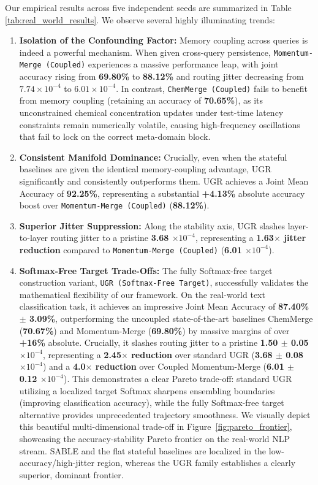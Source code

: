 Our empirical results across five independent seeds are summarized in Table \ref{tab:real_world_results}. We observe several highly illuminating trends:
\begin{enumerate}
    \item \textbf{Isolation of the Confounding Factor:} Memory coupling across queries is indeed a powerful mechanism. When given cross-query persistence, \texttt{Momentum-Merge (Coupled)} experiences a massive performance leap, with joint accuracy rising from \textbf{69.80\%} to \textbf{88.12\%} and routing jitter decreasing from $7.74 \times 10^{-4}$ to $6.01 \times 10^{-4}$. In contrast, \texttt{ChemMerge (Coupled)} fails to benefit from memory coupling (retaining an accuracy of \textbf{70.65\%}), as its unconstrained chemical concentration updates under test-time latency constraints remain numerically volatile, causing high-frequency oscillations that fail to lock on the correct meta-domain block.
    \item \textbf{Consistent Manifold Dominance:} Crucially, even when the stateful baselines are given the identical memory-coupling advantage, UGR significantly and consistently outperforms them. UGR achieves a Joint Mean Accuracy of \textbf{92.25\%}, representing a substantial \textbf{+4.13\%} absolute accuracy boost over \texttt{Momentum-Merge (Coupled)} (\textbf{88.12\%}).
    \item \textbf{Superior Jitter Suppression:} Along the stability axis, UGR slashes layer-to-layer routing jitter to a pristine \textbf{3.68 $\times 10^{-4}$}, representing a \textbf{1.63$\times$ jitter reduction} compared to \texttt{Momentum-Merge (Coupled)} (\textbf{6.01 $\times 10^{-4}$}).
    \item \textbf{Softmax-Free Target Trade-Offs:} The fully Softmax-free target construction variant, \texttt{UGR (Softmax-Free Target)}, successfully validates the mathematical flexibility of our framework. On the real-world text classification task, it achieves an impressive Joint Mean Accuracy of \textbf{87.40\% $\pm$ 3.09\%}, outperforming the uncoupled state-of-the-art baselines ChemMerge (\textbf{70.67\%}) and Momentum-Merge (\textbf{69.80\%}) by massive margins of over \textbf{+16\%} absolute. Crucially, it slashes routing jitter to a pristine \textbf{1.50 $\pm$ 0.05 $\times 10^{-4}$}, representing a \textbf{2.45$\times$ reduction} over standard UGR (\textbf{3.68 $\pm$ 0.08 $\times 10^{-4}$}) and a \textbf{4.0$\times$ reduction} over Coupled Momentum-Merge (\textbf{6.01 $\pm$ 0.12 $\times 10^{-4}$}). This demonstrates a clear Pareto trade-off: standard UGR utilizing a localized target Softmax sharpens ensembling boundaries (improving classification accuracy), while the fully Softmax-free target alternative provides unprecedented trajectory smoothness. We visually depict this beautiful multi-dimensional trade-off in Figure~\ref{fig:pareto_frontier}, showcasing the accuracy-stability Pareto frontier on the real-world NLP stream. SABLE and the flat stateful baselines are localized in the low-accuracy/high-jitter region, whereas the UGR family establishes a clearly superior, dominant frontier.
\end{enumerate}

